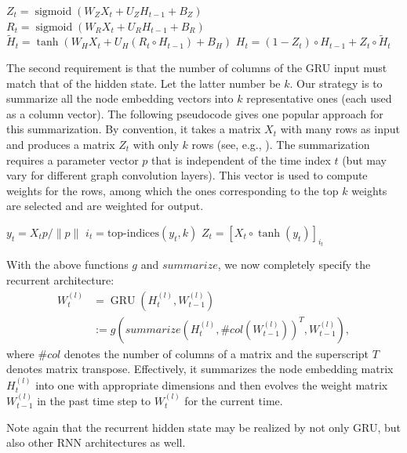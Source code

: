 \documentclass[letterpaper]{article} %
\DeclareMathOperator{\sigmoid}{sigmoid}
\DeclareMathOperator{\gru}{GRU}
\begin{document}
\begin{algorithmic}[1]
  \baselineskip=15pt
  \State $Z_t = \sigmoid(W_ZX_t + U_ZH_{t-1} + B_Z)$
  \State $R_t = \sigmoid(W_RX_t + U_RH_{t-1} + B_R)$
  \State $\widetilde{H}_t = \tanh(W_HX_t + U_H(R_t\circ H_{t-1})+B_H)$
  \State $H_t = (1-Z_t) \circ H_{t-1} + Z_t \circ \widetilde{H}_t$
  \EndFunction
\end{algorithmic}

The second requirement is that the number of columns of the GRU input must match that of the hidden state. Let the latter number be $k$. Our strategy is to summarize all the node embedding vectors into $k$ representative ones (each used as a column vector). The following pseudocode gives one popular approach for this summarization. By convention, it takes a matrix $X_t$ with many rows as input and produces a matrix $Z_t$ with only $k$ rows (see, e.g., \cite{Cangea2018,Gao2019}). The summarization requires a parameter vector $p$ that is independent of the time index $t$ (but may vary for different graph convolution layers). This vector is used to compute weights for the rows, among which the ones corresponding to the top $k$ weights are selected and are weighted for output.

\begin{algorithmic}[1]
  \baselineskip=15pt
  \State $y_t = X_tp/\|p\|$
  \State $i_t = \text{top-indices}(y_t, k)$
  \State $Z_t = [X_t \circ \tanh(y_t)]_{i_t}$
  \EndFunction
\end{algorithmic}

With the above functions $g$ and $summarize$, we now completely specify the recurrent architecture:
\begin{align*}
  W_t^{(l)} &= \gru(H_t^{(l)}, W_{t-1}^{(l)}) \\
  &:= g(summarize(H_t^{(l)}, \#col(W_{t-1}^{(l)}))^T, W_{t-1}^{(l)}),
\end{align*}
where $\#col$ denotes the number of columns of a matrix and the superscript $T$ denotes matrix transpose. Effectively, it summarizes the node embedding matrix $H_t^{(l)}$ into one with appropriate dimensions and then evolves the weight matrix $W_{t-1}^{(l)}$ in the past time step to $W_t^{(l)}$ for the current time.

Note again that the recurrent hidden state may be realized by not only GRU, but also other RNN architectures as well.


\end{document}
